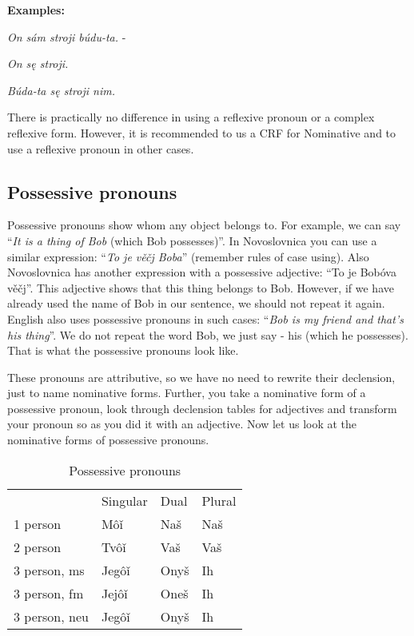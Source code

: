 \textbf{Examples:}

\textit{On sám stroji búdu-ta.} -

\textit{On sę stroji.}

\textit{Búda-ta sę stroji nim.}

There is practically no difference in using a reflexive pronoun or a complex reflexive form. However, it is recommended to us a CRF for Nominative and to use a reflexive pronoun in other cases.

\subsection{Possessive pronouns}

Possessive pronouns show whom any object belongs to. For example, we can say “\textit{It is a thing of Bob} (which Bob possesses)”. In Novoslovnica you can use a similar expression: “\textit{To je věčj Boba}” (remember rules of case using). Also Novoslovnica has another expression with a possessive adjective: “To je Bobóva věčj”. This adjective shows that this thing belongs to Bob. However, if we have already used the name of Bob in our sentence, we should not repeat it again. English also uses possessive pronouns in such cases: “\textit{Bob is my friend and that’s his thing}”. We do not repeat the word Bob, we just say - his (which he possesses). That is what the possessive pronouns look like.

These pronouns are attributive, so we have no need to rewrite their declension, just to name nominative forms. Further, you take a nominative form of a possessive pronoun, look through declension tables for adjectives and transform your pronoun so as you did it with an adjective. Now let us look at the nominative forms of possessive pronouns.

\begin{table}
	\caption{Possessive pronouns}
	\begin{tabular}{llll}
		& Singular & Dual & Plural \\
		1 person & Môǐ & Naš & Naš \\
		2 person & Tvôǐ & Vaš & Vaš \\
		3 person, ms & Jegôǐ & Onyš & Ih \\
		3 person, fm & Jejôǐ & Oneš & Ih \\
		3 person, neu & Jegôǐ & Onyš & Ih
	\end{tabular}
\end{table}

